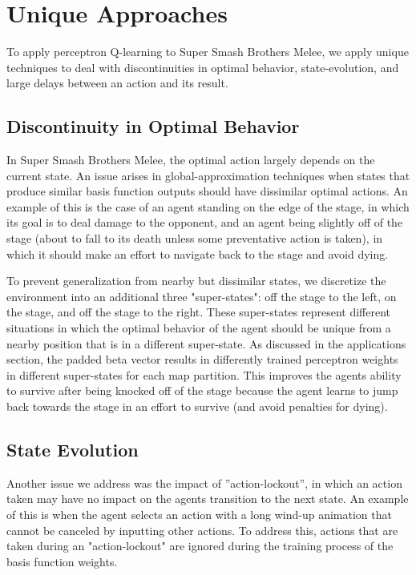 \section{Unique Approaches}

To apply perceptron Q-learning to Super Smash Brothers Melee, we apply unique techniques to deal with discontinuities in optimal behavior, state-evolution, and large delays between an action and its result.

\subsection{Discontinuity in Optimal Behavior}
In Super Smash Brothers Melee, the optimal action largely depends on the current state. An issue arises in global-approximation techniques when states that produce similar basis function outputs should have dissimilar optimal actions. An example of this is the case of an agent standing on the edge of the stage, in which its goal is to deal damage to the opponent, and an agent being slightly off of the stage (about to fall to its death unless some preventative action is taken), in which it should make an effort to navigate back to the stage and avoid dying. 

To prevent generalization from nearby but dissimilar states, we discretize the environment into an additional three "super-states": off the stage to the left, on the stage, and off the stage to the right. These super-states represent different situations in which the optimal behavior of the agent should be unique from a nearby position that is in a different super-state. As discussed in the applications section, the padded beta vector results in differently trained perceptron weights in different super-states for each map partition. This improves the agents ability to survive after being knocked off of the stage because the agent learns to jump back towards the stage in an effort to survive (and avoid penalties for dying). 

\subsection{State Evolution}
Another issue we address was the impact of ”action-lockout”, in which an action taken may have no impact on the agents transition to the next state. An example of this is when the agent selects an action with a long wind-up animation that cannot be canceled by inputting other actions. To address this, actions that are taken during an "action-lockout" are ignored during the training process of the basis function weights. 

